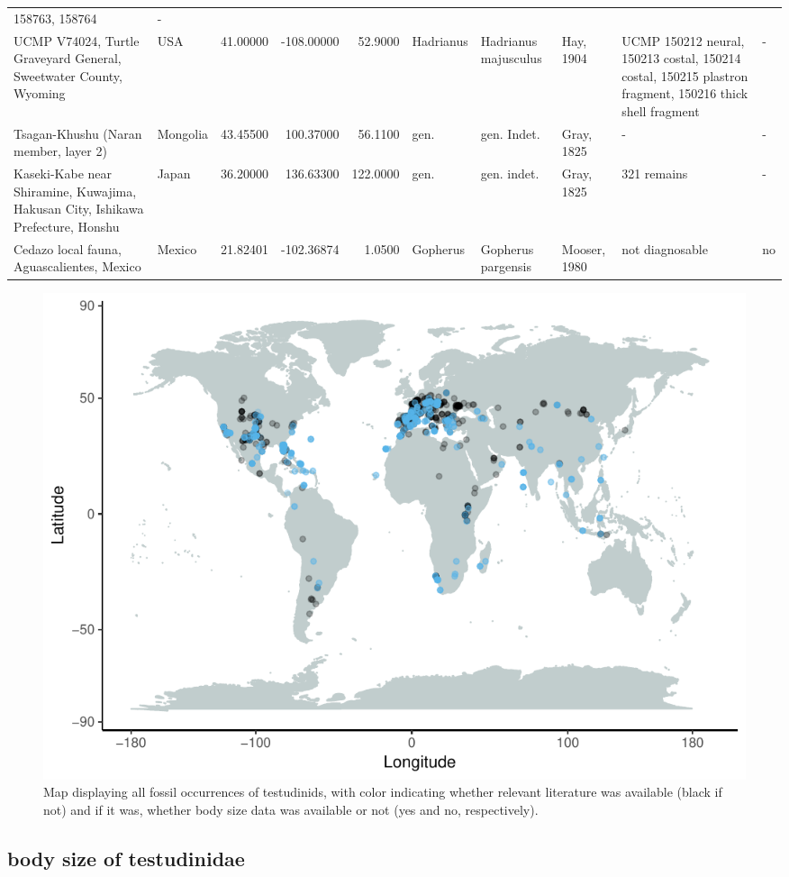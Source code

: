 \documentclass[]{article}
\begin{document}
\begin{longtable}[]{@{}llrrrlllll@{}}
158763, 158764 & -\tabularnewline
UCMP V74024, Turtle Graveyard General, Sweetwater County, Wyoming & USA
& 41.00000 & -108.00000 & 52.9000 & Hadrianus & Hadrianus majusculus &
Hay, 1904 & UCMP 150212 neural, 150213 costal, 150214 costal, 150215
plastron fragment, 150216 thick shell fragment & -\tabularnewline
Tsagan-Khushu (Naran member, layer 2) & Mongolia & 43.45500 & 100.37000
& 56.1100 & gen. & gen. Indet. & Gray, 1825 & - & -\tabularnewline
Kaseki-Kabe near Shiramine, Kuwajima, Hakusan City, Ishikawa Prefecture,
Honshu & Japan & 36.20000 & 136.63300 & 122.0000 & gen. & gen. indet. &
Gray, 1825 & 321 remains & -\tabularnewline
Cedazo local fauna, Aguascalientes, Mexico & Mexico & 21.82401 &
-102.36874 & 1.0500 & Gopherus & Gopherus pargensis & Mooser, 1980 & not
diagnosable & no\tabularnewline
\bottomrule
\end{longtable}

\begin{figure}[htbp]
\centering
\includegraphics{MA_JJ_files/figure-latex/MapFossilOccurrences-1.pdf}
\caption{Map displaying all fossil occurrences of testudinids, with
color indicating whether relevant literature was available (black if
not) and if it was, whether body size data was available or not (yes and
no, respectively).}
\end{figure}

\newpage

\subsection{body size of testudinidae}\label{body-size-of-testudinidae}
\end{document}

